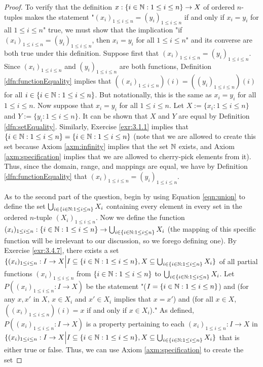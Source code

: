 \documentclass[../main.tex]{subfiles}
\begin{document}
\begin{enumerate}[ref={\thesection.\arabic*}]
\begin{proof}
        To verify that the definition $x:\{i\in\mathbb{N}:1\leq i\leq n\}\to X$ of ordered $n$-tuples makes the statement "$(x_i)_{1\leq i\leq n}=(y_i)_{1\leq i\leq n}$ if and only if $x_i=y_i$ for all $1\leq i\leq n$" true, we must show that the implication "if $(x_i)_{1\leq i\leq n}=(y_i)_{1\leq i\leq n}$, then $x_i=y_i$ for all $1\leq i\leq n$" and its converse are both true under this definition. Suppose first that $(x_i)_{1\leq i\leq n}=(y_i)_{1\leq i\leq n}$. Since $(x_i)_{1\leq i\leq n}$ and $(y_i)_{1\leq i\leq n}$ are both functions, Definition \ref{dfn:functionEquality} implies that $((x_i)_{1\leq i\leq n})(i)=((y_i)_{1\leq i\leq n})(i)$ for all $i\in\{i\in\mathbb{N}:1\leq i\leq n\}$. But notationally, this is the same as $x_i=y_i$ for all $1\leq i\leq n$. Now suppose that $x_i=y_i$ for all $1\leq i\leq n$. Let $X:=\{x_i:1\leq i\leq n\}$ and $Y:=\{y_i:1\leq i\leq n\}$. It can be shown that $X$ and $Y$ are equal by Definition \ref{dfn:setEquality}. Similarly, Exercise \ref{exr:3.1.1} implies that $\{i\in\mathbb{N}:1\leq i\leq n\}=\{i\in\mathbb{N}:1\leq i\leq n\}$ (note that we are allowed to create this set because Axiom \ref{axm:infinity} implies that the set $\mathbb{N}$ exists, and Axiom \ref{axm:specification} implies that we are allowed to cherry-pick elements from it). Thus, since the domain, range, and mappings are equal, we have by Definition \ref{dfn:functionEquality} that $(x_i)_{1\leq i\leq n}=(y_i)_{1\leq i\leq n}$.\par
        As to the second part of the question, begin by using Equation \ref{eqn:union} to define the set $\bigcup_{i\in\{i\in\mathbb{N}:1\leq i\leq n\}}X_i$ containing every element in every set in the ordered $n$-tuple $(X_i)_{1\leq i\leq n}$. Now we define the function $(x_i)_{1\leq i\leq n}:\{i\in\mathbb{N}:1\leq i\leq n\}\to\bigcup_{i\in\{i\in\mathbb{N}:1\leq i\leq n\}}X_i$ (the mapping of this specific function will be irrelevant to our discussion, so we forego defining one). By Exercise \ref{exr:3.4.7}, there exists a set $\{(x_i)_{1\leq i\leq n}:I\to X\Big|I\subseteq\{i\in\mathbb{N}:1\leq i\leq n\},X\subseteq\bigcup_{i\in\{i\in\mathbb{N}:1\leq i\leq n\}}X_i\}$ of all partial functions $(x_i)_{1\leq i\leq n}$ from $\{i\in\mathbb{N}:1\leq i\leq n\}$ to $\bigcup_{i\in\{i\in\mathbb{N}:1\leq i\leq n\}}X_i$. Let $P((x_i)_{1\leq i\leq n}:I\to X)$ be the statement "($I=\{i\in\mathbb{N}:1\leq i\leq n\}$) and (for any $x,x'$ in $X$, $x\in X_i$ and $x'\in X_i$ implies that $x=x'$) and (for all $x\in X$, $((x_i)_{1\leq i\leq n})(i)=x$ if and only if $x\in X_i$)." As defined, $P((x_i)_{1\leq i\leq n}:I\to X)$ is a property pertaining to each $(x_i)_{1\leq i\leq n}:I\to X$ in $\{(x_i)_{1\leq i\leq n}:I\to X\Big|I\subseteq\{i\in\mathbb{N}:1\leq i\leq n\},X\subseteq\bigcup_{i\in\{i\in\mathbb{N}:1\leq i\leq n\}}X_i\}$ that is either true or false. Thus, we can use Axiom \ref{axm:specification} to create the set

\end{proof}
\end{enumerate}
\end{document}
